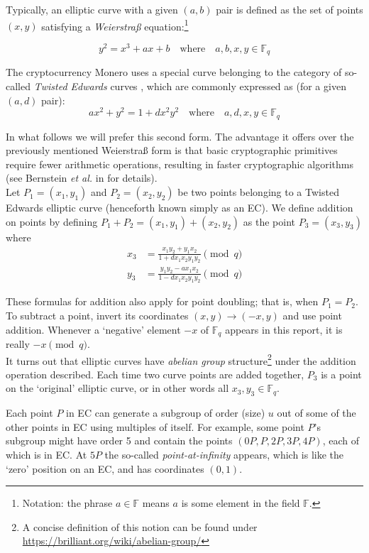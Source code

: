 Typically, an elliptic curve with a given $(a,b)$ pair is defined as the set of points \((x, y)\) satisfying a {\em Weierstraß} equation:\footnote{\label{notation1}Notation: the phrase $a \in \mathbb{F}$ means $a$ is some element in the field $\mathbb{F}$.}

\[y^2 = x^3 + a x + b \quad \textrm{where} \quad a, b, x, y \in \mathbb{F}_q \]

The cryptocurrency Monero uses a special curve belonging to the category of so-called {\em Twisted Edwards} curves \cite{Bernstein2008}, which are commonly expressed as (for a given $(a,d)$ pair): 
\[a x^2 + y^2 = 1 + d x^2 y^2 \quad \textrm{where} \quad a, d, x, y \in \mathbb{F}_q \]


In what follows we will prefer this second form. The advantage it offers over the previously mentioned Weierstraß form is that basic cryptographic primitives require fewer arithmetic operations, resulting in faster cryptographic algorithms (see Bernstein {\em et al.} in \cite{Bernstein2007} for details).\\

Let \(P_1 = (x_1, y_1)\) and \(P_2 = (x_2, y_2)\) be two points belonging to a Twisted Edwards elliptic curve (henceforth known simply as an EC). We define addition on points by defining $P_1 + P_2 = (x_1, y_1) + (x_2, y_2)$ as the point $P_3 = (x_3, y_3)$ where\\
\begin{align*}
x_3 & =  \frac{x_1 y_2 + y_1 x_ 2}{1 + d x_1 x_2 y_1 y_2}  \pmod{q} \\
y_3 & =  \frac{y_1 y_2 - a x_1 x_2}{1 - d x_1 x_2 y_1 y_2} \pmod{q} 
\end{align*}

These formulas for addition also apply for point doubling; that is, when  \(P_1 = P_2\). To subtract a point, invert its coordinates $(x,y) \rightarrow (-x,y)$ \cite{Bernstein2008} and use point addition. Whenever a `negative' element $-x$ of $\mathbb{F}_q$ appears in this report, it is really $-x \pmod{q}$.
\\

It turns out that elliptic curves have {\em abelian group} structure\footnote{\label{abelian_note}A concise definition of this notion can be found under \url{https://brilliant.org/wiki/abelian-group/}} under the addition operation described. Each time two curve points are added together, $P_3$ is a point on the `original' elliptic curve, or in other words all $x_3,y_3 \in \mathbb{F}_q$.

Each point $P$ in EC can generate a subgroup of order (size) $u$ out of some of the other points in EC using multiples of itself. For example, some point $P$’s subgroup might have order 5 and contain the points $(0P, P, 2P, 3P, 4P)$, each of which is in EC. At $5P$ the so-called {\em point-at-infinity} appears, which is like the `zero’ position on an EC, and has coordinates $(0, 1)$. 

